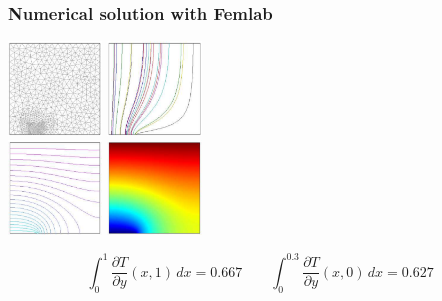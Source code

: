 \documentclass[10pt]{beamer}
\begin{document}
\begin{frame}
  \frametitle{Numerical solution with Femlab}

\begin{center}
  \includegraphics[height=25mm]{cell-mesh.pdf} \qquad\qquad
  \includegraphics[height=25mm]{cell-lines.pdf} \\[\bigskipamount]
  \includegraphics[height=25mm]{cell-contours.pdf} \qquad\qquad
  \includegraphics[height=25mm]{cell-shaded.pdf}
\end{center}

\pause

\[
  \int_0^1 \frac{\partial T}{\partial y} (x, 1) \, dx = 0.667
  \qquad
  \int_0^{0.3} \frac{\partial T}{\partial y} (x, 0) \, dx = 0.627
\]

\end{frame}
\end{document}
